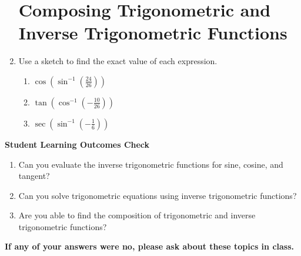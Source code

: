 \documentclass[11pt]{article}
\begin{document}
\begin{enumerate}
\section{Composing Trigonometric and Inverse Trigonometric Functions}
\item Use a sketch to find the exact value of each expression.
\begin{enumerate}
\item $\displaystyle \cos(\sin^{-1}(\frac{24}{26}))$\vfill
\vfill
\newpage
\item $\displaystyle \tan(\cos^{-1}(-\frac{10}{26}))$\vfill
\item $\displaystyle \sec(\sin^{-1}(-\frac{1}{6}))$\vfill
\end{enumerate}


\end{enumerate}
\vfill
\noindent \textbf{Student Learning Outcomes Check}

\begin{enumerate}
\item Can you evaluate the inverse trigonometric functions for sine, cosine, and tangent?
\item Can you solve trigonometric equations using inverse trigonometric functions?
\item Are you able to find the composition of trigonometric and inverse trigonometric functions?

\end{enumerate}

\noindent \textbf{If any of your answers were no, please ask about these topics in class.}
\end{document}
